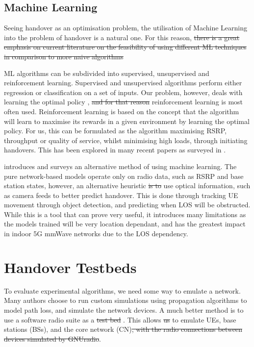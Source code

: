 \subsection{Machine Learning}
Seeing handover as an optimisation problem, the utilisation of Machine Learning  into the problem of handover is a natural one. For this reason, \st{there is a great emphasis on current literature on the feasibility of using different ML techniques in comparison to more naive algorithms} 

ML algorithms can be subdivided into supervised, unsupervised and reinforcement learning. Supervised and unsupervised algorithms perform either regression or classification on a set of inputs. Our problem, however, deals with learning the optimal policy , \st{and for that reason}  reinforcement learning is most often used. Reinforcement learning is based on the concept that the algorithm will learn to maximise its rewards in a given environment by learning the optimal policy. For us, this can be formulated as the algorithm maximising RSRP, throughput or quality of service, whilst minimising high loads, through initiating handovers. This has been explored in many recent papers as surveyed in \citet{mollel_survey_2021}.

\citet{mollel_survey_2021} introduces and surveys an alternative method of using machine learning. The pure network-based models operate only on radio data, such as RSRP and base station states, however, an alternative heuristic \st{is to} use optical information, such as camera feeds to better predict handover. This is done through tracking UE movement through object detection, and predicting when LOS will be obstructed. While this is a tool that can prove very useful, it introduces many limitations as the models trained will be very location dependant, and has the greatest impact in indoor 5G mmWave networks due to the LOS dependency.

\section{Handover Testbeds}
To evaluate experimental algorithms, we need some way to emulate a network. Many authors choose to run custom simulations using propagation algorithms to model path loss, and simulate the network devices. A much better method is to use a software radio suite as a \st{test bed} . This allows \st{us} to emulate UEs, base stations (BSs), and the core network (CN)\st{, with the radio connections between devices simulated by GNUradio}.

